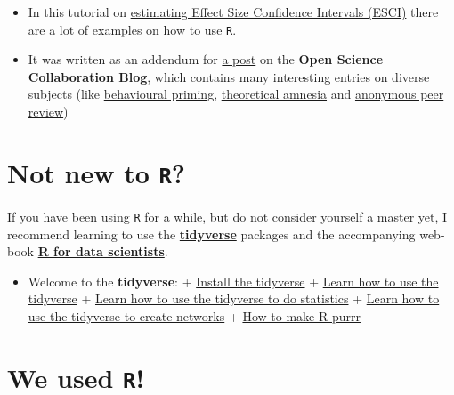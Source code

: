 \documentclass[12pt,]{book}
\providecommand{\tightlist}{%
  \setlength{\itemsep}{0pt}\setlength{\parskip}{0pt}}
\let\stdsection\section
\renewcommand\section{\newpage\stdsection}
\begin{document}
\begin{itemize}
  \begin{itemize}
  \tightlist
  \item
    In this tutorial on \href{http://fredhasselman.com/post/2015-05-05-OSC-R-ESCI-Tutorial/}{estimating Effect Size Confidence Intervals (ESCI)} there are a lot of examples on how to use \texttt{R}.
  \item
    It was written as an addendum for \href{http://centerforopenscience.github.io/osc/2014/03/06/confidence\%20intervals/}{a post} on the \textbf{Open Science Collaboration Blog}, which contains many interesting entries on diverse subjects (like \href{http://centerforopenscience.github.io/osc/2014/03/26/behavioral-priming/}{behavioural priming}, \href{http://centerforopenscience.github.io/osc/2013/11/20/theoretical-amnesia/}{theoretical amnesia} and \href{http://centerforopenscience.github.io/osc/2014/05/15/anonymous-peer-review/}{anonymous peer review})
  \end{itemize}
\end{itemize}

\hypertarget{not-new-to-r}{%
\section*{\texorpdfstring{\textbf{Not new to \texttt{R}?}}{Not new to R?}}\label{not-new-to-r}}

If you have been using \texttt{R} for a while, but do not consider yourself a master yet, I recommend learning to use the \href{http://tidyverse.org}{\textbf{tidyverse}} packages and the accompanying web-book \href{http://r4ds.had.co.nz}{\textbf{R for data scientists}}.

\begin{itemize}
\tightlist
\item
  Welcome to the \textbf{tidyverse}:
  + \href{https://www.tidyverse.org}{Install the tidyverse}
  + \href{http://r4ds.had.co.nz}{Learn how to use the tidyverse}
  + \href{http://moderndive.com}{Learn how to use the tidyverse to do statistics}
  + \href{https://www.rdocumentation.org/packages/tidygraph/versions/0.1.0}{Learn how to use the tidyverse to create networks}
  + \href{http://purrr.tidyverse.org}{How to make R purrr}
\end{itemize}

\hypertarget{we-used-r}{%
\section*{\texorpdfstring{\textbf{We used \texttt{R}!}}{We used R!}}\label{we-used-r}}
\end{document}
